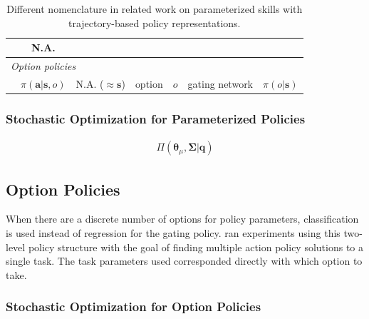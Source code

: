 \documentclass[12pt]{article}
\newcommand{\polg}   {\ensuremath{\Pi}}
\newcommand{\taskp}  {\ensuremath{\mathbf{q}}}
\newcommand{\app}    {\ensuremath{\bm{\theta}}}
\newcommand{\covar}  {\ensuremath{\bm{\Sigma}}}
\begin{document}
\begin{table}[ht]
\begin{scriptsize}
\begin{tabular}{|l|l|rl|rl|rl|}
& \multicolumn{2}{c|}{N.A.} \\  
\hline
\multicolumn{8}{|l|}{\em Option policies}\\
\citet{daniel12learning}    
& $\pi(\mathbf{a}|\mathbf{s},o)$
& \multicolumn{2}{c|}{N.A. ($\approx\mathbf{s}$)}   
& option           & $o$ 
& gating network   & $\pi(o|\mathbf{s})$ \\  
\end{tabular}
\end{scriptsize}
  \caption{\label{tab_nomenclature} Different nomenclature in related work on parameterized skills with trajectory-based policy representations.}
\end{table}

\subsubsection{Stochastic Optimization for Parameterized Policies}

\begin{align}
\label{eq:gating_par}\polg(\app_\mu,\covar|\taskp)
\end{align}

\citet{kupcsik13dataefficient}

\citet{marin12towards}



\subsection{Option Policies}

When there are a discrete number of options for policy parameters, classification is used instead of regression for the gating policy. \citet{daniel12learning} ran experiments using this two-level policy structure with the goal of finding multiple action policy solutions to a single task. The task parameters used corresponded directly with which option to take. 

\subsubsection{Stochastic Optimization for Option Policies}
\end{document}
